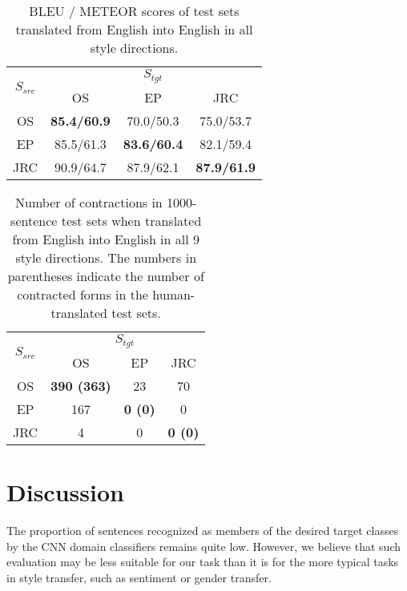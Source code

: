 \documentclass[11pt,a4paper]{article}
\begin{document}
\begin{table}[]
\centering
\begin{tabular}{|c|c|c|c|}
\hline
\multirow{2}{*}{$S_{src}$} & \multicolumn{3}{c|}{$S_{tgt}$}                                  \\ \cline{2-4} 
                              & OS                   & EP                   & JRC                  \\ \hline
OS                            & \textbf{85.4/60.9} & 70.0/50.3          & 75.0/53.7          \\ \hline
EP                            & 85.5/61.3          & \textbf{83.6/60.4} & 82.1/59.4          \\ \hline
JRC                           & 90.9/64.7          & 87.9/62.1          & \textbf{87.9/61.9} \\ \hline
\end{tabular}
\caption{\small BLEU / METEOR scores of test sets translated from English into English in all style directions.
      }
\label{tab-enenbleumet}
\end{table}

\begin{table}[]
\centering
\begin{tabular}{|c|c|c|c|}
\hline
\multirow{2}{*}{$S_{src}$} & \multicolumn{3}{c|}{$S_{tgt}$}\\
\cline{2-4} 
                      & OS                 & EP             & JRC            \\ \hline
OS                    & \textbf{390 (363)} & 23             & 70             \\ \hline
EP                    & 167                & \textbf{0 (0)} & 0              \\ \hline
JRC                   & 4                 & 0              & \textbf{0 (0)} \\ \hline
\end{tabular}
\caption{\small Number of contractions in 1000-sentence test sets when translated from English into English in all 9 style directions. The numbers in parentheses indicate the number of contracted forms in the human-translated test sets.
      }
      \label{tab-enencontr}
\end{table}

\section{Discussion}
\label{sec:discussion}

The proportion of sentences recognized as members of the desired target classes by the CNN domain classifiers remains quite low. However, we believe that such evaluation may be less suitable for our task than it is for the more typical tasks in style transfer, such as sentiment or gender transfer.
\end{document}
